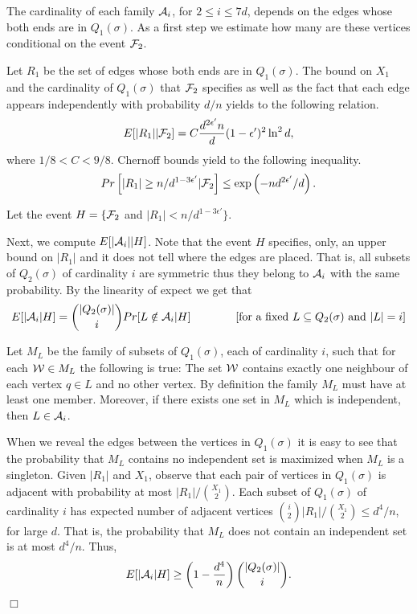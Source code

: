 \documentclass[a4paper,10pt]{article}
\makeatletter
\newenvironment{claimproof}[1]{\noindent{\bf Proof of Claim #1\@:}}{\hfill $\Box$\\}
\makeatother
\begin{document}
\begin{claimproof}{\ref{claim:GoodFraction}}
The cardinality of each family ${\cal A}_i$, for $2\leq i\leq 7d$,
depends on the edges whose both ends are in $Q_1(\sigma)$. 
As a  first step we estimate how many are these vertices 
conditional on the event ${\cal F}_2$.

Let $R_1$ be the set of edges whose both ends are in $Q_1(\sigma)$.
The bound on $X_1$ and the cardinality of $Q_1(\sigma)$ that
${\cal F}_2$ specifies as well as the fact that each edge appears
independently with probability $d/n$ yields to the following relation.
\begin{displaymath}
E[|R_1||{\cal F}_2]=C\frac{d^{2\epsilon'}n}{d}  (1-\epsilon')^2 \ln^2 d,
\end{displaymath}
where $1/8<C<9/8$. Chernoff bounds yield to the following inequality.
\begin{equation}\label{AlmostNoOfEdgesInQ1}
Pr\left[|R_1|\geq n/d^{1-3\epsilon'} |{\cal F}_2\right]\leq \exp\left( -nd^{2\epsilon'}/d \right).
\end{equation}


\noindent
Let the event $H=\{ {\cal F}_2$  and $|R_1|< n/d^{1-3\epsilon'}\}$. 

Next, we compute $E[|{\cal A}_i||H]$.  Note that the event $H$
specifies, only, an upper bound on $|R_1|$ and it does not tell
where the edges are placed. That is, all subsets of $Q_2(\sigma)$
of cardinality $i$ are symmetric thus they belong to ${\cal A}_i$
with the same probability. By the linearity  of expect we get that
\begin{displaymath}
E[|{\cal A}_i|H]={|Q_2(\sigma)| \choose i}Pr[L\notin {\cal A}_i|H]
\qquad\qquad \mbox{[for a fixed  $L\subseteq Q_2(\sigma)$ and $|L|=i$]}
\end{displaymath}

\noindent
Let $M_{L}$ be the family of subsets of $Q_1(\sigma)$, each of 
cardinality $i$, such that for each ${\cal W}\in M_L$ the following
is true:  The set ${\cal W}$  contains  exactly one neighbour of
each vertex $q\in L$ and no other vertex. By definition the 
family $M_L$ must have at least one member. Moreover, if there 
exists one set in $M_L$ which is independent, then $L\in {\cal A}_i$.  


When we reveal the edges between the vertices in $Q_1(\sigma)$
it is easy to see that the probability that $M_L$ contains no 
independent set is maximized when $M_L$ is a singleton.
Given $|R_1|$ and $X_1$, observe that each pair of vertices in 
$Q_1(\sigma)$ is adjacent with probability  at most 
$|R_1|/{X_1\choose 2}$.  Each subset of $Q_1(\sigma)$ of cardinality $i$
has expected number of adjacent vertices ${i \choose 2}|R_1|/{X_1\choose 2} \leq d^4/n$,
for large $d$.  That is, the probability that $M_L$ does not contain
an independent set is  at most $d^4/n$. Thus, 
\begin{equation}\label{eq:ExpectCalAi}
E[|{\cal A}_i|H]\geq \left(1-\frac{d^4}{n}\right){|Q_2(\sigma)| \choose i}.
\end{equation}


\end{claimproof}
\end{document}
